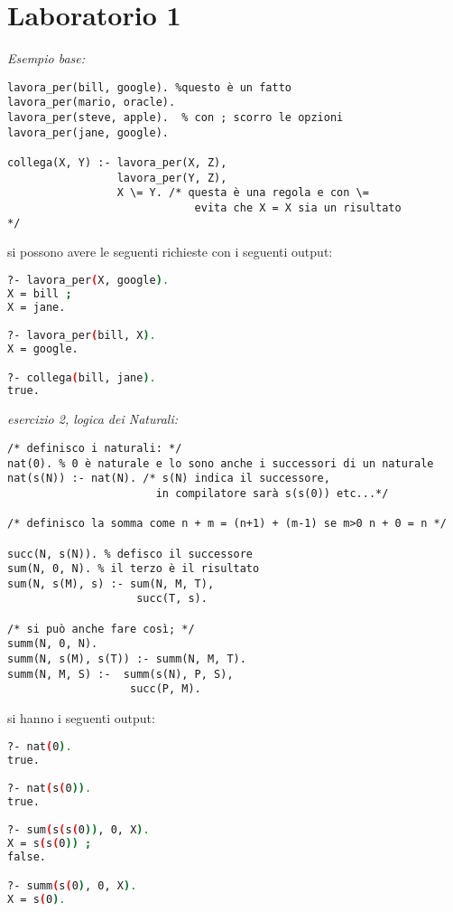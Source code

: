 \documentclass[a4paper,12pt, oneside]{book}
\begin{document}
\section{Laboratorio 1}
\begin{esercizio}
\textit{Esempio base:}
\begin{verbatim}
lavora_per(bill, google). %questo è un fatto
lavora_per(mario, oracle).
lavora_per(steve, apple).  % con ; scorro le opzioni
lavora_per(jane, google).

collega(X, Y) :- lavora_per(X, Z),
                 lavora_per(Y, Z),
                 X \= Y. /* questa è una regola e con \= 
                             evita che X = X sia un risultato 	                          */
\end{verbatim}
si possono avere le seguenti richieste con i seguenti output:
\begin{shaded}
\begin{lstlisting}[language=bash]
?- lavora_per(X, google).
X = bill ;
X = jane.

?- lavora_per(bill, X).
X = google.

?- collega(bill, jane).
true.
\end{lstlisting}
\end{shaded}
\end{esercizio}
\newpage
\begin{esercizio}
\textit{esercizio 2, logica dei Naturali:}
\begin{verbatim}
/* definisco i naturali: */
nat(0). % 0 è naturale e lo sono anche i successori di un naturale
nat(s(N)) :- nat(N). /* s(N) indica il successore, 
                       in compilatore sarà s(s(0)) etc...*/

/* definisco la somma come n + m = (n+1) + (m-1) se m>0 n + 0 = n */

succ(N, s(N)). % defisco il successore
sum(N, 0, N). % il terzo è il risultato
sum(N, s(M), s) :- sum(N, M, T),
                    succ(T, s).

/* si può anche fare così; */
summ(N, 0, N).
summ(N, s(M), s(T)) :- summ(N, M, T).
summ(N, M, S) :-  summ(s(N), P, S),
                   succ(P, M).
\end{verbatim}
si hanno i seguenti output:
\begin{shaded}
\begin{lstlisting}[language=bash]
?- nat(0).
true.

?- nat(s(0)).
true.

?- sum(s(s(0)), 0, X).
X = s(s(0)) ;
false.

?- summ(s(0), 0, X).
X = s(0).
\end{lstlisting}
\end{shaded}
\end{esercizio}
\end{document}

